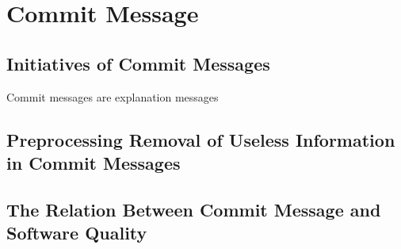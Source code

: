 \section{Commit Message}
\label{sec:message}
\subsection{Initiatives of Commit Messages}
Commit messages are explanation messages 
\subsection{Preprocessing Removal of Useless Information in Commit Messages}
\subsection{The Relation Between Commit Message and Software Quality}